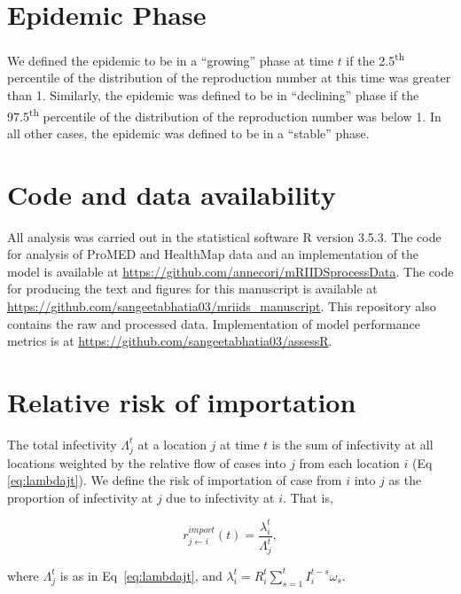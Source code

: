 \documentclass[9pt,twocolumn,twoside,lineno]{pnas-new}
\begin{document}
{\section*{Epidemic Phase}
We defined the epidemic to be in a ``growing'' phase at time $t$ if the 
2.5\textsuperscript{th} percentile of the distribution of the reproduction
number at this time was greater than 1. Similarly, the epidemic was
defined to be in ``declining'' phase if the 97.5\textsuperscript{th} 
percentile of the distribution of the reproduction number was below
1. In all other cases, the epidemic was defined to be in a ``stable'' phase.

\section*{Code and data availability}
All analysis was carried out in the statistical software R version
3.5.3. The code for analysis of ProMED and HealthMap data and an
implementation of the model is available at
\url{https://github.com/annecori/mRIIDSprocessData}. The code for
producing the text and figures for this manuscript is available at
\url{https://github.com/sangeetabhatia03/mriids_manuscript}. This
repository also contains the raw and processed data. Implementation
of model performance metrics is at
\url{https://github.com/sangeetabhatia03/assessR}.

\section*{Relative risk of
  importation}\label{relative-risk-of-importation}

The total infectivity $\Lambda_{j}^{t}$ at a location $j$ at time $t$ is the sum of
infectivity at all locations weighted by the relative flow of cases
into $j$ from each location $i$ (Eq \ref{eq:lambdajt}). We define the risk of
importation of case from $i$ into $j$ as the proportion of infectivity
at $j$ due to infectivity at $i$. That is, 

\begin{equation*}
r_{j \leftarrow i}^{import}(t) = \frac{\lambda_i^t}{\Lambda_j^t},
\end{equation*}

where $\Lambda_j^t$ is as in Eq~\ref{eq:lambdajt}, and
$\lambda_i^t = R_{i}^{t} \sum\limits_{s =1}^{t} {I_{i}^{t - s}\omega_{s}}$.

} %

\showmatmethods{} %


\showacknow{} %


\end{document}
